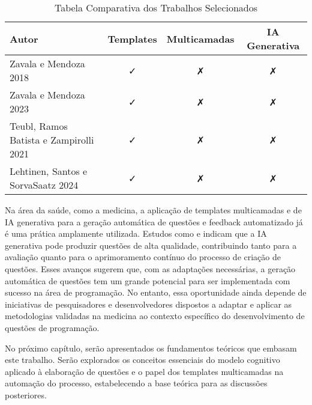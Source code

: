 \begin{table}[htbp]
    \centering
    \begin{tabular}{|l|c|c|c|}
        \hline
        Autor& Templates & Multicamadas & IA Generativa \\ \hline
        Zavala e Mendoza 2018& \faCheck & \faClose& \faClose\\ \hline 
        Zavala e Mendoza 2023 & \faCheck&  \faClose& \faClose\\ \hline
        Teubl, Ramos Batista e Zampirolli 2021 & \faCheck& \faClose& \faClose\\\hline
 Lehtinen, Santos e SorvaSaatz 2024 & \faCheck & \faClose&\faClose \\\hline
    \end{tabular}
    \caption{Tabela Comparativa dos Trabalhos Selecionados}
    \label{tab:table-comparativa-trabalhos-selecionados}
\end{table}



Na área da saúde, como a medicina, a aplicação de templates multicamadas e de IA generativa para a geração automática de questões e feedback automatizado já é uma prática amplamente utilizada. Estudos como \parencite{falcao2023} e \parencite{kiyak2024} indicam que a IA generativa pode produzir questões de alta qualidade, contribuindo tanto para a avaliação quanto para o aprimoramento contínuo do processo de criação de questões. Esses avanços sugerem que, com as adaptações necessárias, a geração automática de questões tem um grande potencial para ser implementada com sucesso na área de programação.
No entanto, essa oportunidade ainda depende de iniciativas de pesquisadores e desenvolvedores dispostos a adaptar e aplicar as metodologias validadas na medicina ao contexto específico do desenvolvimento de questões de programação.

No próximo capítulo, serão apresentados os fundamentos teóricos que embasam este trabalho.  Serão explorados os conceitos essenciais do modelo cognitivo aplicado à elaboração de questões e o papel dos templates multicamadas na automação do processo, estabelecendo a base teórica para as discussões posteriores. 